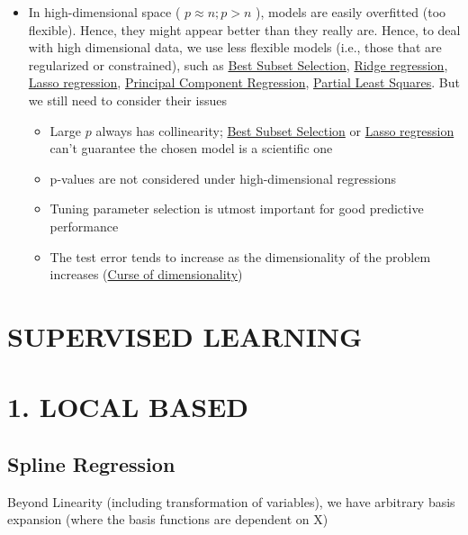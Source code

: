 \documentclass[
]{book}
\begin{document}
\begin{itemize}
\item
  In high-dimensional space ( \(p \approx n; p >n\) ), models are easily overfitted (too flexible). Hence, they might appear better than they really are. Hence, to deal with high dimensional data, we use less flexible models (i.e., those that are regularized or constrained), such as \protect\hyperlink{best-subset-selection}{Best Subset Selection}, \protect\hyperlink{ridge-regression}{Ridge regression}, \protect\hyperlink{lasso-regression}{Lasso regression}, \protect\hyperlink{principal-component-regression}{Principal Component Regression}, \protect\hyperlink{partial-least-squares}{Partial Least Squares}. But we still need to consider their issues

  \begin{itemize}
  \item
    Large \(p\) always has collinearity; \protect\hyperlink{best-subset-selection}{Best Subset Selection} or \protect\hyperlink{lasso-regression}{Lasso regression} can't guarantee the chosen model is a scientific one
  \item
    p-values are not considered under high-dimensional regressions
  \item
    Tuning parameter selection is utmost important for good predictive performance
  \item
    The test error tends to increase as the dimensionality of the problem increases (\protect\hyperlink{curse-of-dimensionality}{Curse of dimensionality})
  \end{itemize}
\end{itemize}

\hypertarget{part-supervised-learning}{%
\part{SUPERVISED LEARNING}\label{part-supervised-learning}}

\hypertarget{part-1.-local-based}{%
\part{1. LOCAL BASED}\label{part-1.-local-based}}

\hypertarget{spline-regression}{%
\chapter{Spline Regression}\label{spline-regression}}

Beyond Linearity (including transformation of variables), we have arbitrary basis expansion (where the basis functions are dependent on X)
\end{document}
